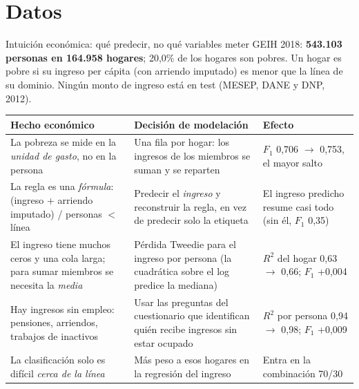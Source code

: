\documentclass[aspectratio=169,10pt]{beamer}
\begin{document}
\section{Datos}

\begin{frame}{Intuición económica: qué predecir, no qué variables meter}
\footnotesize
GEIH 2018: \textbf{543.103 personas en 164.958 hogares}; 20,0\% de los
hogares son pobres. Un hogar es pobre si su ingreso per cápita (con arriendo
imputado) es menor que la línea de su dominio. Ningún monto de ingreso está en
test (MESEP, DANE y DNP, 2012).
\vspace{1mm}

\scriptsize
\setlength{\tabcolsep}{5pt}
\renewcommand{\arraystretch}{1.1}
\begin{tabular}{@{}>{\raggedright\arraybackslash}p{3.3cm}>{\raggedright\arraybackslash}p{5.6cm}>{\raggedright\arraybackslash}p{4.8cm}@{}}
\toprule
\textbf{Hecho económico} & \textbf{Decisión de modelación} & \textbf{Efecto} \\
\midrule
La pobreza se mide en la \emph{unidad de gasto}, no en la persona &
  Una fila por hogar: los ingresos de los miembros se suman y se reparten &
  $F_1$ 0,706 $\to$ 0,753, el mayor salto \\
La regla es una \emph{fórmula}: (ingreso + arriendo imputado) / personas
  $<$ línea &
  Predecir el \emph{ingreso} y reconstruir la regla, en vez de predecir solo
  la etiqueta &
  El ingreso predicho resume casi todo (sin él, $F_1$ 0,35) \\
El ingreso tiene muchos ceros y una cola larga; para sumar miembros se
  necesita la \emph{media} &
  Pérdida Tweedie para el ingreso por persona (la cuadrática sobre el log
  predice la mediana) &
  $R^2$ del hogar 0,63 $\to$ 0,66; $F_1$ +0,004 \\
Hay ingresos sin empleo: pensiones, arriendos, trabajos de inactivos &
  Usar las preguntas del cuestionario que identifican quién recibe ingresos
  sin estar ocupado &
  $R^2$ por persona 0,94 $\to$ 0,98; $F_1$ +0,009 \\
La clasificación solo es difícil \emph{cerca de la línea} &
  Más peso a esos hogares en la regresión del ingreso &
  Entra en la combinación 70/30 \\
\bottomrule
\end{tabular}
\vspace{1mm}

\end{frame}
\end{document}
